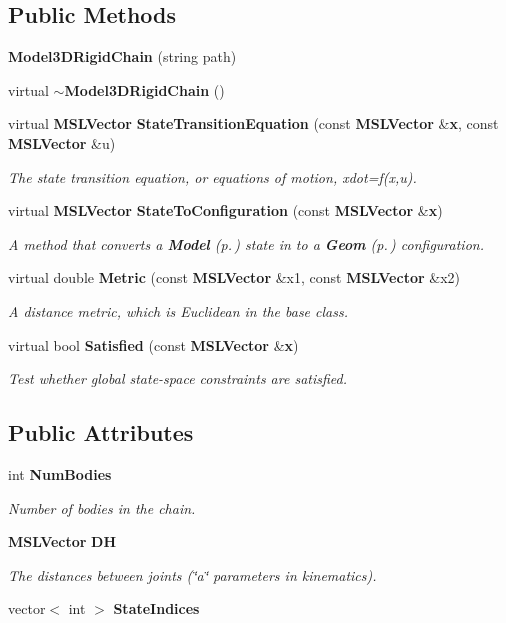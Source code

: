 \subsection*{Public Methods}
\begin{CompactItemize}
\item 
{\bf Model3DRigid\-Chain} (string path)
\item 
virtual {\bf $\sim$Model3DRigid\-Chain} ()
\item 
virtual {\bf MSLVector} {\bf State\-Transition\-Equation} (const {\bf MSLVector} \&{\bf x}, const {\bf MSLVector} \&u)
\begin{CompactList}\small\item\em The state transition equation, or equations of motion, xdot=f(x,u).\item\end{CompactList}\item 
virtual {\bf MSLVector} {\bf State\-To\-Configuration} (const {\bf MSLVector} \&{\bf x})
\begin{CompactList}\small\item\em A method that converts a {\bf Model} {\rm (p.\,\pageref{classModel})} state in to a {\bf Geom} {\rm (p.\,\pageref{classGeom})} configuration.\item\end{CompactList}\item 
virtual double {\bf Metric} (const {\bf MSLVector} \&x1, const {\bf MSLVector} \&x2)
\begin{CompactList}\small\item\em A distance metric, which is Euclidean in the base class.\item\end{CompactList}\item 
virtual bool {\bf Satisfied} (const {\bf MSLVector} \&{\bf x})
\begin{CompactList}\small\item\em Test whether global state-space constraints are satisfied.\item\end{CompactList}\end{CompactItemize}
\subsection*{Public Attributes}
\begin{CompactItemize}
\item 
int {\bf Num\-Bodies}
\begin{CompactList}\small\item\em Number of bodies in the chain.\item\end{CompactList}\item 
{\bf MSLVector} {\bf DH}
\begin{CompactList}\small\item\em The distances between joints (\char`\"{}a\char`\"{} parameters in kinematics).\item\end{CompactList}\item 
vector$<$ int $>$ {\bf State\-Indices}
\end{CompactItemize}


